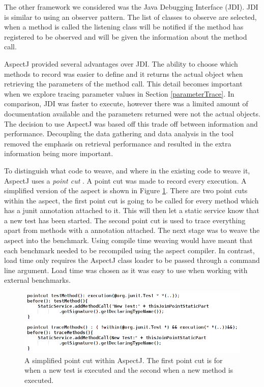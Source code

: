 The other framework we considered was the Java Debugging Interface (JDI). JDI is similar to using an observer pattern. The list of classes to observe are selected, when a method is called the listening class will be notified if the method has registered to be observed and will be given the information about the method call. 

AspectJ provided several advantages over JDI. The ability to choose which methods to record was easier to define and it returns the actual object when retrieving the parameters of the method call. This detail becomes important when we explore tracing parameter values in Section \ref{parameterTrace}. In comparison, JDI was faster to execute, however there was a limited amount of documentation available and the parameters returned were not the actual objects. The decision to use AspectJ was based off this trade off between information and performance. Decoupling the data gathering and data analysis in the tool removed the emphasis on retrieval performance and resulted in the extra information being more important.

To distinguish what code to weave, and where in the existing code to weave it, AspectJ uses a \textit{point cut} \cite{aspectj}. A point cut was made to record every execution. A simplified version of the aspect is shown in Figure \ref{fig:aspectused}. There are two point cuts within the aspect, the first point cut is going to be called for every method which has a junit \@Test annotation attached to it. This will then let a static service know that a new test has been started. The second point cut is used to trace everything apart from methods with a  \@Test annotation attached. The next stage was to weave the aspect into the benchmark. Using compile time weaving would have meant that each benchmark needed to be recompiled using the aspect compiler. In contrast, load time only requires the AspectJ class loader to be passed through a command line argument. Load time was chosen as it was easy to use when working with external benchmarks.

\begin{figure}[h]
\begin{center}
\includegraphics[width = \textwidth]{aspect.png}
\end{center}
\caption{A simplified point cut within AspectJ. The first point cut is for when a new test is executed and the second when a new method is executed.}
\label{fig:aspectused}
\end{figure}

